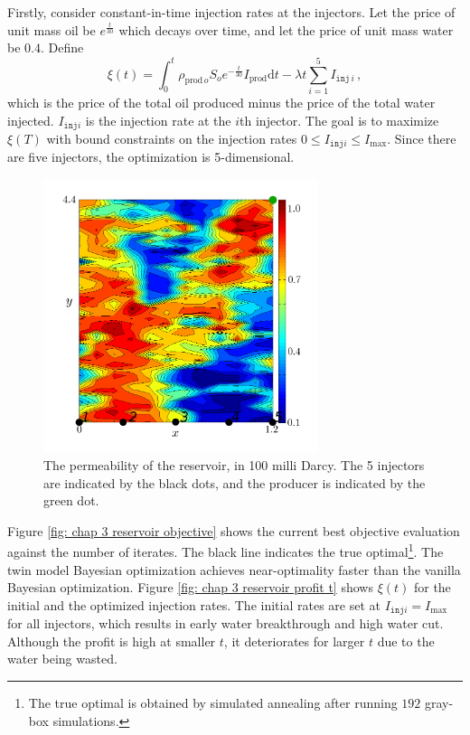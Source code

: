 Firstly, consider constant-in-time injection rates at the injectors. Let the price
of unit mass oil be $e^{\frac{t}{30}}$ which decays over time, and let the price of unit mass water 
be $0.4$. Define 
\begin{equation}
    \xi(t) = \int_0^t \rho_{\textrm{prod}\, o} S_o e^{-\frac{t}{30}} I_{\textrm{prod}}\textrm{d}t 
           - \lambda t \sum_{i=1}^5 I_{\texttt{inj}\, i}\,,
    \label{eqn: chap 3 reservoir cum cost}
\end{equation}
which is the price of the total oil produced minus the price of the total water injected.
$I_{\texttt{inj}i}$ is the injection rate
at the $i$th injector. 
The goal is to maximize $\xi(T)$ with bound constraints on the injection rates
$0\le I_{\texttt{inj}i} \le I_{\max}$.
Since there are five injectors, the optimization is 5-dimensional.\\

\begin{figure}[htbp]\begin{center}
    \includegraphics[width=6.cm,height=8cm]{../reservoir_perm.png}
    \caption{The permeability of the reservoir, in 100 milli Darcy. The 5 injectors
             are indicated by the black dots, and the producer is indicated by the green dot.}
    \label{fig: chap 3 reservoir setup}
\end{center}\end{figure}

Figure \ref{fig: chap 3 reservoir objective} shows the current best objective evaluation
against the number of iterates. 
The black line indicates the true optimal\footnote{The true optimal
is obtained by simulated annealing after running $192$ gray-box simulations.}.
The twin model Bayesian optimization achieves
near-optimality faster than the vanilla Bayesian optimization. 
Figure \ref{fig: chap 3 reservoir profit t} shows $\xi(t)$ 
for the initial and the optimized injection rates. The initial rates are
set at $I_{\texttt{inj}i} = I_{\max}$ for all injectors, 
which results in early water breakthrough and high water cut.
Although the profit is high at smaller $t$, it deteriorates for larger $t$ due
to the water being wasted.\\

